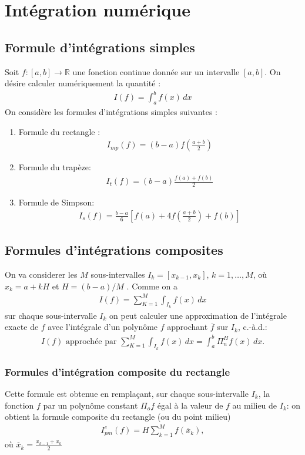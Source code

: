 \chapter{Intégration numérique}
\section{Formule d'intégrations simples}
Soit $f :[a,b] \rightarrow\mathbb R$ une fonction continue donnée sur un intervalle $[a,b]$. On désire calculer numériquement la quantité : 
\begin{eqnarray}
	I(f)=\int_a^b f(x)\,dx	
\end{eqnarray}
On considère les formules d’intégrations simples suivantes : 
\begin{enumerate}
	\item Formule du rectangle :
	\begin{eqnarray}
		I_{mp}(f)=(b-a)f(\frac{a+b}{2})
	\end{eqnarray}
	\item Formule du trapèze:
	\begin{eqnarray}
		I_t(f)=(b-a)\frac{f(a)+f(b)}{2}
	\end{eqnarray}
	\item Formule de Simpson:
	\begin{eqnarray}
		I_s(f)=\frac{b-a}{6}\left[f(a)+4f(\frac{a+b}{2})+f(b)\right]
	\end{eqnarray}
\end{enumerate}

\section{Formules d'intégrations composites}
On va considerer les $M$ sous-intervalles $I_k = [x_{k-1},x_k]$, $k=1,\dots,M$, 
où 
$x_k = a + kH$ et $H = (b - a)/M$ . Comme on a 
\begin{eqnarray}
	I(f)=\sum_{K=1}^M\int_{I_k}f(x)\,dx
\end{eqnarray}
sur chaque sous-intervalle $I_k$ on peut calculer une approximation de l’intégrale 
exacte de $f$ avec l’intégrale d’un polynôme $f$ approchant $\overline f$ sur $I_k$, c.-à.d.: 
\begin{eqnarray}
	I (f ) \text{ approchée par } \sum_{K=1}^M\int_{I_k}f(x)\,dx=\int_a^b\Pi_n^Hf(x)\,dx.
\end{eqnarray}

\subsection{Formules d'intégration composite du rectangle}
Cette formule est obtenue en remplaçant, sur chaque sous-intervalle $I_k$, la 
fonction $f$ par un polynôme constant $\Pi_of$ égal à la valeur de $f$ au milieu de $I_k$: on obtient la formule composite du rectangle (ou du 
point milieu) 
\begin{eqnarray}
	I_{pm}^c(f)=H\sum_{k=1}^Mf(\overline x_k),
\end{eqnarray}
où $\overline x_k=\frac{x_{k-1}+x_k}{2}$

